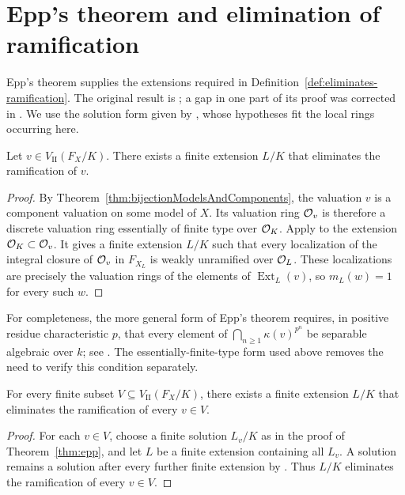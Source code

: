 \section{Epp's theorem and elimination of ramification}\label{sec:epp-elimination-ramification}

Epp's theorem supplies the extensions required in Definition~\ref{def:eliminates-ramification}.
The original result is \cite{Epp}; a gap in one part of its proof was corrected in \cite{KuhlmannEppCorrection}.
We use the solution form given by \cite[\href{https://stacks.math.columbia.edu/tag/09II}{Proposition 15.118.8}]{Stacks}, whose hypotheses fit the local rings occurring here.

\begin{theorem}\label{thm:epp}
    Let $v\in V_\mathrm{II}(F_X/K)$.
    There exists a finite extension $L/K$ that eliminates the ramification of $v$.
\end{theorem}

\begin{proof}
    By Theorem~\ref{thm:bijectionModelsAndComponents}, the valuation $v$ is a component valuation on some model of $X$.
    Its valuation ring $\mathcal{O}_v$ is therefore a discrete valuation ring essentially of finite type over $\mathcal O_K$.
    Apply \cite[\href{https://stacks.math.columbia.edu/tag/09II}{Proposition 15.118.8}]{Stacks} to the extension $\mathcal O_K\subset\mathcal{O}_v$.
    It gives a finite extension $L/K$ such that every localization of the integral closure of $\mathcal{O}_v$ in $F_{X_L}$ is weakly unramified over $\mathcal O_L$.
    These localizations are precisely the valuation rings of the elements of $\operatorname{Ext}_L(v)$, so $m_L(w)=1$ for every such $w$.
\end{proof}

For completeness, the more general form of Epp's theorem requires, in positive residue characteristic $p$, that every element of $\bigcap_{n\geq1}\kappa(v)^{p^n}$ be separable algebraic over $k$; see \cite[\href{https://stacks.math.columbia.edu/tag/09F9}{Theorem 15.117.18}]{Stacks}.
The essentially-finite-type form used above removes the need to verify this condition separately.

\begin{corollary}\label{cor:epp-finite-set}
    For every finite subset $V\subseteq V_\mathrm{II}(F_X/K)$, there exists a finite extension $L/K$ that eliminates the ramification of every $v\in V$.
\end{corollary}

\begin{proof}
    For each $v\in V$, choose a finite solution $L_v/K$ as in the proof of Theorem~\ref{thm:epp}, and let $L$ be a finite extension containing all $L_v$.
    A solution remains a solution after every further finite extension by \cite[\href{https://stacks.math.columbia.edu/tag/0GLR}{Lemma 15.118.1}]{Stacks}.
    Thus $L/K$ eliminates the ramification of every $v\in V$.
\end{proof}

